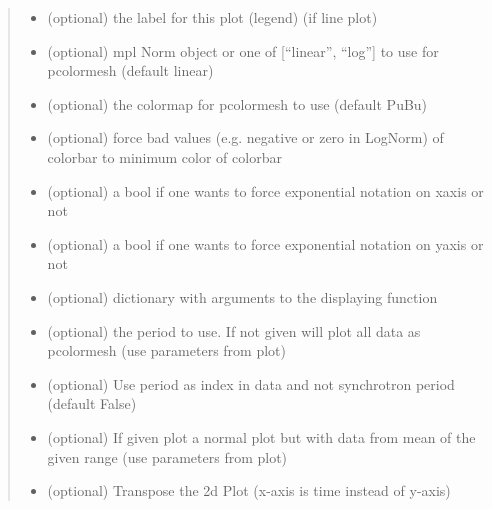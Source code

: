 \documentclass[letterpaper,10pt,openany,oneside,english]{sphinxmanual}
\begin{document}
\begin{fulllineitems}
\begin{fulllineitems}
\begin{quote}
\begin{description}
\begin{itemize}
\item {} 
 \textendash{} (optional) the label for this plot (legend) (if line plot)

\item {} 
 \textendash{} (optional) mpl Norm object or one of {[}“linear”, “log”{]} to use for pcolormesh  
(default linear)

\item {} 
 \textendash{} (optional) the colormap for pcolormesh to use (default PuBu)

\item {} 
 \textendash{} (optional) force bad values (e.g. negative or zero in LogNorm) of  
colorbar to minimum color of colorbar

\item {} 
 \textendash{} (optional) a bool if one wants to force exponential notation on  
xaxis or not

\item {} 
 \textendash{} (optional) a bool if one wants to force exponential notation on  
yaxis or not

\item {} 
 \textendash{} (optional) dictionary with arguments to the displaying function

\item {} 
 \textendash{} (optional) the period to use. If not given will plot all data as pcolormesh  
(use parameters from plot)

\item {} 
 \textendash{} (optional) Use period as index in data and not synchrotron period  
(default False)

\item {} 
 \textendash{} (optional) If given plot a normal plot but with data from mean of the  
given range (use parameters from plot)

\item {} 
 \textendash{} (optional) Transpose the 2d Plot (x-axis is time instead of y-axis)

\end{itemize}

\end{description}\end{quote}


\end{fulllineitems}
\end{fulllineitems}
\end{document}
